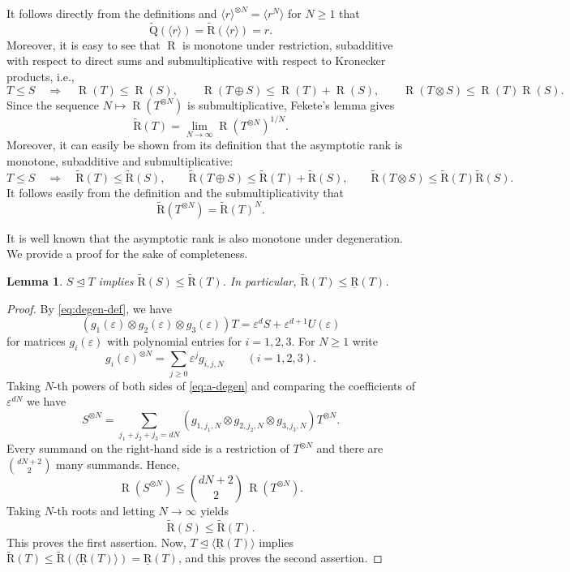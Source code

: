 \documentclass[11pt,letterpaper]{article}
\newtheorem{lemma}[theorem]{Lemma}\AddToHook{env/lemma/begin}{\crefalias{theorem}{lemma}}
\numberwithin{equation}{section}
\newcommand{\brk}{\underline{\mathrm{R}}}
\newcommand{\ark}{\widetilde{\mathrm{R}}}
\DeclareMathOperator{\Rk}{\mathrm{R}}
\begin{document}
It follows directly from the definitions and $\langle r\rangle^{\otimes N}=\langle r^N\rangle$ for $N\geq 1$ that \[
\widetilde{\mathrm{Q}}(\langle r\rangle)=\ark(\langle r\rangle)=r.
\]
Moreover, it is easy to see that $\Rk$ is monotone under restriction, subadditive with respect to direct sums and submultiplicative with respect to Kronecker products, i.e., \[
T\leq S\quad\Rightarrow\quad\Rk(T)\leq \Rk(S), \qquad \Rk(T\oplus S)\leq \Rk(T)+\Rk(S),\qquad\Rk(T\otimes S) \leq \Rk(T)\Rk(S).
\]
Since the sequence $N\mapsto \Rk(T^{\otimes N})$ is submultiplicative, Fekete's lemma gives \[
\ark(T) = \lim_{N\rightarrow \infty} \Rk(T^{\otimes N})^{1/N}.
\]
Moreover, it can easily be shown from its definition that the asymptotic rank is monotone, subadditive and submultiplicative: \[
T\leq S\quad\Rightarrow\quad\ark(T)\leq \ark(S), \qquad \ark(T\oplus S)\leq \ark(T)+\ark(S),\qquad\ark(T\otimes S) \leq \ark(T)\ark(S).
\] It follows easily from the definition and the submultiplicativity that \begin{equation}
\label{eq:monomial}
    \ark(T^{\otimes N}) = \ark(T)^{N}.
\end{equation}

It is well known that the asymptotic rank is also monotone under degeneration.
We provide a proof for the sake of completeness.
\begin{lemma}
\label{lem:asymp-border-ineq}
    $S\trianglelefteq T$ implies $\ark(S)\leq \ark(T)$.
    In particular, $\ark(T)\leq \brk(T)$.
\end{lemma}
\begin{proof}
By \cref{eq:degen-def}, we have \begin{equation}
\label{eq:a-degen}
\left(g_1(\varepsilon)\otimes g_2(\varepsilon)\otimes g_3(\varepsilon)\right)T = \varepsilon^d S + \varepsilon^{d+1}U(\varepsilon)
\end{equation} for matrices $g_i(\varepsilon)$ with polynomial entries for $i=1,2,3$.
For $N\geq 1$ write \[
g_i(\varepsilon)^{\otimes N} = \sum_{j\geq 0} \varepsilon^{j} g_{i,j,N} \qquad (i=1,2,3).
\]
Taking $N$-th powers of both sides of \cref{eq:a-degen} and comparing the coefficients of $\varepsilon^{dN}$ we have \[
S^{\otimes N} = \sum_{j_1+j_2+j_3=dN} \left( g_{1,j_1,N}\otimes g_{2,j_2,N}\otimes g_{3,j_3,N} \right) T^{\otimes N}.
\] Every summand on the right-hand side is a restriction of $T^{\otimes N}$ and there are $\binom{dN+2}{2}$ many summands.
Hence, \[
\Rk(S^{\otimes N}) \leq \binom{dN+2}{2} \, \Rk(T^{\otimes N}).
\] Taking $N$-th roots and letting $N\rightarrow\infty$ yields \[
\ark(S)\leq \ark(T).
\] This proves the first assertion.
Now, $T\trianglelefteq \langle \brk(T)\rangle$ implies $\ark(T)\leq \ark(\langle \brk(T)\rangle)=\brk(T)$,
and this proves the second assertion.
\end{proof}
\end{document}
